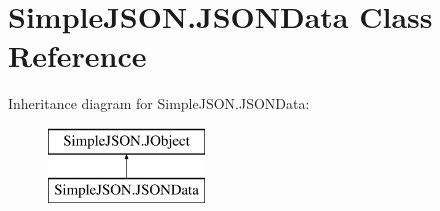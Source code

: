 \hypertarget{class_simple_j_s_o_n_1_1_j_s_o_n_data}{\section{Simple\+J\+S\+O\+N.\+J\+S\+O\+N\+Data Class Reference}
\label{class_simple_j_s_o_n_1_1_j_s_o_n_data}
}
Inheritance diagram for Simple\+J\+S\+O\+N.\+J\+S\+O\+N\+Data\+:\begin{figure}[H]
\begin{center}
\leavevmode
\includegraphics[height=2.000000cm]{class_simple_j_s_o_n_1_1_j_s_o_n_data}
\end{center}
\end{figure}

